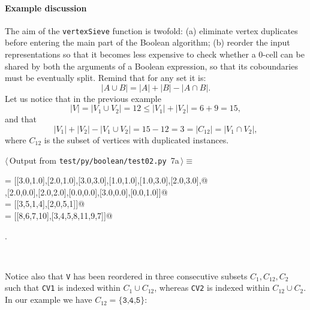 \documentclass[11pt,oneside]{article}	%
\begin{document}
\paragraph{Example discussion} 
The aim of the \texttt{vertexSieve} function is twofold: (a) eliminate vertex duplicates before entering the main part of the Boolean algorithm; (b) reorder the input representations so that it becomes less expensive to check whether a 0-cell can be shared by both the arguments of a Boolean expression, so that its coboundaries must be eventually split. Remind that for any set it is:
\[
|A\cup B| = |A|+|B|-|A\cap B|.
\]
Let us notice that in the previous example
\[
|V| = |V_1 \cup V_2| = 12 \leq |V_1|+|V_2| = 6+9 = 15,
\]
and that 
\[
|V_1|+|V_2| - |V_1 \cup V_2| = 15 - 12 = 3 = |C_{12}| = |V_1 \cap V_2|,
\]
where $C_{12}$ is the subset of vertices with duplicated instances.
\begin{flushleft} \small
\begin{minipage}{\linewidth} \label{scrap11}
\protect{}$\langle\,$Output from \texttt{test/py/boolean/test02.py}\nobreak\ {\footnotesize 7a}$\,\rangle\equiv$
\vspace{-1ex}
\begin{list}{}{} \item
\mbox{}\verb@V   = [[3.0,1.0],[2.0,1.0],[3.0,3.0],[1.0,1.0],[1.0,3.0],[2.0,3.0],@\\
\mbox{}\verb@       [3.0,2.0],[2.0,0.0],[2.0,2.0],[0.0,0.0],[3.0,0.0],[0.0,1.0]]@\\
\mbox{} = [[3,5,1,4],[2,0,5,1]]@\\
\mbox{} = [[8,6,7,10],[3,4,5,8,11,9,7]]@\\
\mbox{}\verb@@{\NWsep}
\end{list}
\vspace{-1ex}
\footnotesize\addtolength{\baselineskip}{-1ex}
\begin{list}{}{\setlength{\itemsep}{-\parsep}\setlength{\itemindent}{-\leftmargin}}
\item {\NWtxtMacroNoRef}.
\end{list}
\end{minipage}\\[4ex]
\end{flushleft}
Notice also that \texttt{V} has been reordered in three consecutive subsets $C_{1},C_{12},C_{2}$ such that \texttt{CV1} is indexed within $C_{1}\cup C_{12}$, whereas \texttt{CV2} is indexed within $C_{12}\cup C_{2}$. In our example we have  $C_{12}=\{\texttt{3,4,5}\}$: 
\end{document}
